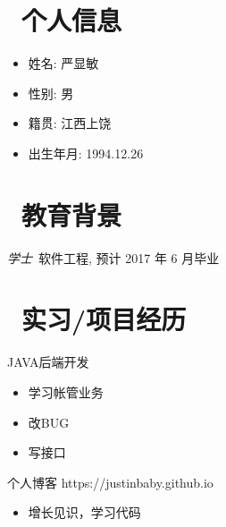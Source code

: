 \documentclass{resume}
\begin{document}




\section{\faInfo\ 个人信息}
\begin{itemize}[parsep=0.5ex]
  \item 姓名: 严显敏
  \item 性别: 男
  \item 籍贯: 江西上饶
  \item 出生年月: 1994.12.26
\end{itemize}

\section{\faGraduationCap\  教育背景}
\textit{学士}\ 软件工程, 预计 2017 年 6 月毕业

\section{\faUsers\ 实习/项目经历}
JAVA后端开发
\begin{itemize}
  \item 学习帐管业务
  \item 改BUG
  \item 写接口
\end{itemize}

\begin{onehalfspacing}
个人博客 https://justinbaby.github.io
\begin{itemize}
    \item 增长见识，学习代码
\end{itemize}
\end{onehalfspacing}


\end{document}
